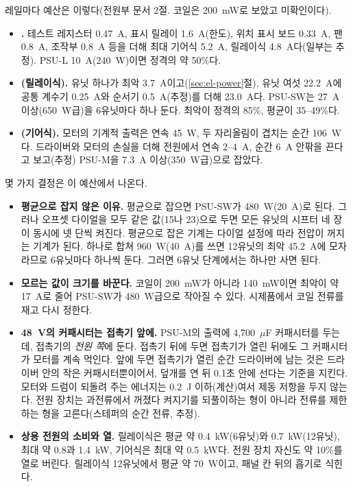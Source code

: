 \Ours 레일마다 예산은 이렇다(전원부 문서 2절. 코일은 200~mW로 보았고 미확인이다).
\begin{itemize}
\item \textbf{.} 테스트 레지스터 0.47~A, 표시 릴레이 1.6~A(한도), 위치 표시 보드 0.33~A, 팬 0.8~A, 조작부
0.8~A 등을 더해 최대 기어식 5.2~A, 릴레이식 4.8~A다(일부는 추정). PSU-L 10~A(240~W)이면 정격의 약 50\%다.
\item \textbf{(릴레이식).} 유닛 하나가 최악 3.7~A이고(\ref{sec:el-power}절), 유닛 여섯 22.2~A에 공통 계수기
0.25~A와 순서기 0.5~A(추정)를 더해 23.0~A다. PSU-SW는 27~A 이상(650~W급)을 6유닛마다 하나 둔다. 최악이 정격의 85\%,
평균이 35--49\%다.
\item \textbf{(기어식).} 모터의 기계적 출력은 연속 45~W, 두 자리올림이 겹치는 순간 106~W다. 드라이버와
모터의 손실을 더해 전원에서 연속 2--4~A, 순간 6~A 안팎을 끈다고 보고(추정) PSU-M을 7.3~A 이상(350~W급)으로 잡았다.
\end{itemize}

몇 가지 결정은 이 예산에서 나온다.
\begin{itemize}
\item \textbf{평균으로 잡지 않은 이유.} 평균으로 잡으면 PSU-SW가 480~W(20~A)로 된다. 그러나 오프셋 다이얼을 모두 같은
값(15나 23)으로 두면 모든 유닛의 시프터 네 장이 동시에 넷 단씩 켜진다. 평균으로 잡은 기계는 다이얼 설정에 따라 전압이
꺼지는 기계가 된다. 하나로 합쳐 960~W(40~A)를 쓰면 12유닛의 최악 45.2~A에 모자라므로 6유닛마다 하나씩 둔다. 그러면
6유닛 단계에서는 하나만 사면 된다.
\item \textbf{모르는 값이 크기를 바꾼다.} 코일이 200~mW가 아니라 140~mW이면 최악이 약 17~A로 줄어 PSU-SW가 480~W급으로
작아질 수 있다. 시제품에서 코일 전류를 재고 다시 정한다.
\item \textbf{48~V의 커패시터는 접촉기 앞에.} PSU-M의 출력에 4,700~$\mu$F 커패시터를 두는데, 접촉기의 \emph{전원 쪽}에
둔다. 접촉기 뒤에 두면 접촉기가 열린 뒤에도 그 커패시터가 모터를 계속 먹인다. 앞에 두면 접촉기가 열린 순간 드라이버에
남는 것은 드라이버 안의 작은 커패시터뿐이어서, 덮개를 연 뒤 0.1초 안에 선다는 기준을 지킨다. 모터와 드럼이 되돌려 주는
에너지는 0.2~J 이하(계산)여서 제동 저항을 두지 않는다. 전원 장치는 과전류에서 꺼졌다 켜지기를 되풀이하는 형이 아니라
전류를 제한하는 형을 고른다(스테퍼의 순간 전류, 추정).
\item \textbf{상용 전원의 소비와 열.} 릴레이식은 평균 약 0.4~kW(6유닛)와 0.7~kW(12유닛), 최대 약 0.8과 1.4~kW, 기어식은 최대
약 0.5~kW다. 전원 장치 자신도 약 10\%를 열로 버린다. 릴레이식 12유닛에서 평균 약 70~W이고, 패널 칸 뒤의 흡기로 식힌다.
\end{itemize}

